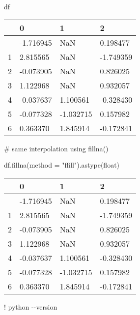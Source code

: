 \documentclass[
  letterpaper,
  DIV=11,
  numbers=noendperiod]{scrreprt}
\newenvironment{Shaded}{\begin{snugshade}}{\end{snugshade}}
\newcommand{\BuiltInTok}[1]{\textcolor[rgb]{0.00,0.23,0.31}{#1}}
\newcommand{\CommentTok}[1]{\textcolor[rgb]{0.37,0.37,0.37}{#1}}
\newcommand{\NormalTok}[1]{\textcolor[rgb]{0.00,0.23,0.31}{#1}}
\newcommand{\OperatorTok}[1]{\textcolor[rgb]{0.37,0.37,0.37}{#1}}
\newcommand{\StringTok}[1]{\textcolor[rgb]{0.13,0.47,0.30}{#1}}
\begin{document}
\begin{Shaded}
\begin{Highlighting}[]
\NormalTok{df}
\end{Highlighting}
\end{Shaded}

\begin{longtable}[]{@{}llll@{}}
\toprule\noalign{}
& 0 & 1 & 2 \\
\midrule\noalign{}
\endhead
\bottomrule\noalign{}
\endlastfoot
0 & -1.716945 & NaN & 0.198477 \\
1 & 2.815565 & NaN & -1.749359 \\
2 & -0.073905 & NaN & 0.826025 \\
3 & 1.122968 & NaN & 0.932057 \\
4 & -0.037637 & 1.100561 & -0.328430 \\
5 & -0.077328 & -1.032715 & 0.157982 \\
6 & 0.363370 & 1.845914 & -0.172841 \\
\end{longtable}

\begin{Shaded}
\begin{Highlighting}[]
\CommentTok{\# same interpolation using fillna()}

\NormalTok{df.fillna(method }\OperatorTok{=} \StringTok{"ffill"}\NormalTok{).astype(}\BuiltInTok{float}\NormalTok{)}
\end{Highlighting}
\end{Shaded}

\begin{longtable}[]{@{}llll@{}}
\toprule\noalign{}
& 0 & 1 & 2 \\
\midrule\noalign{}
\endhead
\bottomrule\noalign{}
\endlastfoot
0 & -1.716945 & NaN & 0.198477 \\
1 & 2.815565 & NaN & -1.749359 \\
2 & -0.073905 & NaN & 0.826025 \\
3 & 1.122968 & NaN & 0.932057 \\
4 & -0.037637 & 1.100561 & -0.328430 \\
5 & -0.077328 & -1.032715 & 0.157982 \\
6 & 0.363370 & 1.845914 & -0.172841 \\
\end{longtable}

\begin{Shaded}
\begin{Highlighting}[]
\OperatorTok{!}\NormalTok{ python }\OperatorTok{{-}{-}}\NormalTok{version}
\end{Highlighting}
\end{Shaded}
\end{document}
